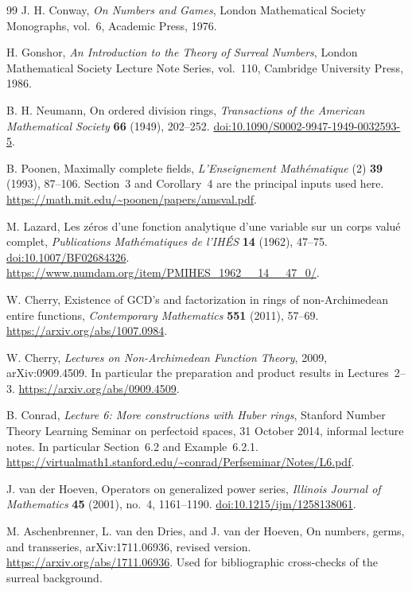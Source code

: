 \documentclass[11pt]{article}
\theoremstyle{plain}
\theoremstyle{plain}
\theoremstyle{plain}
\theoremstyle{definition}
\theoremstyle{definition}
\theoremstyle{definition}
\theoremstyle{definition}
\theoremstyle{remark}
\begin{document}
\clearpage
{}
\begingroup\raggedright
\begin{thebibliography}{99}
J. H. Conway, \emph{On Numbers and Games}, London Mathematical Society
Monographs, vol.~6, Academic Press, 1976.

H. Gonshor, \emph{An Introduction to the Theory of Surreal Numbers},
London Mathematical Society Lecture Note Series, vol.~110,
Cambridge University Press, 1986.

B. H. Neumann, On ordered division rings, \emph{Transactions of the American
Mathematical Society} \textbf{66} (1949), 202--252.
\href{https://doi.org/10.1090/S0002-9947-1949-0032593-5}{doi:10.1090/S0002-9947-1949-0032593-5}.

B. Poonen, Maximally complete fields, \emph{L'Enseignement
Math\'ematique} (2) \textbf{39} (1993), 87--106.
Section~3 and Corollary~4 are the principal inputs used here.
\url{https://math.mit.edu/~poonen/papers/amsval.pdf}.

M. Lazard, Les z\'eros d'une fonction analytique d'une variable sur un
corps valu\'e complet, \emph{Publications Math\'ematiques de l'IH\'ES}
\textbf{14} (1962), 47--75.
\href{https://doi.org/10.1007/BF02684326}{doi:10.1007/BF02684326}.
\url{https://www.numdam.org/item/PMIHES_1962__14__47_0/}.

W. Cherry, Existence of GCD's and factorization in rings of
non-Archimedean entire functions, \emph{Contemporary Mathematics}
\textbf{551} (2011), 57--69.
\url{https://arxiv.org/abs/1007.0984}.

W. Cherry, \emph{Lectures on Non-Archimedean Function Theory}, 2009,
arXiv:0909.4509. In particular the preparation and product results in
Lectures~2--3. \url{https://arxiv.org/abs/0909.4509}.

B. Conrad, \emph{Lecture 6: More constructions with Huber rings}, Stanford
Number Theory Learning Seminar on perfectoid spaces, 31 October 2014,
informal lecture notes. In particular Section~6.2 and Example~6.2.1.
\url{https://virtualmath1.stanford.edu/~conrad/Perfseminar/Notes/L6.pdf}.

J. van der Hoeven, Operators on generalized power series,
\emph{Illinois Journal of Mathematics} \textbf{45} (2001), no.~4,
1161--1190.
\href{https://doi.org/10.1215/ijm/1258138061}{doi:10.1215/ijm/1258138061}.

M. Aschenbrenner, L. van den Dries, and J. van der Hoeven,
On numbers, germs, and transseries, arXiv:1711.06936, revised version.
\url{https://arxiv.org/abs/1711.06936}.
Used for bibliographic cross-checks of the surreal background.


\end{thebibliography}
\end{document}
